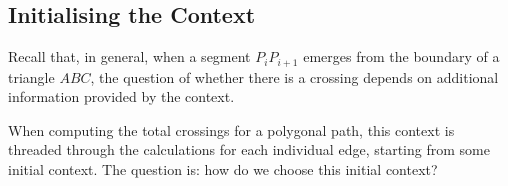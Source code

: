



\subsection{Initialising the Context}\label{sec:ContextInitialisation}
Recall that, in general, when a segment $P_iP_{i+1}$ emerges from the boundary of a triangle $ABC$, the question of whether there is a crossing depends on additional information provided by the context. 

When computing the total crossings for a polygonal path, this context is threaded through the calculations for each individual edge, starting from some initial context. The question is: how do we choose this initial context?

